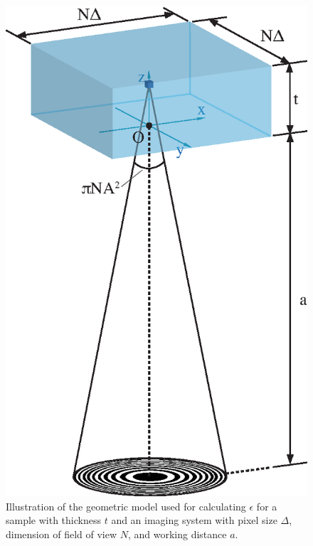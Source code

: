 \documentclass[]{article}
\begin{document}
\begin{figure}[!b]
\begin{center}
\includegraphics[scale=.6]{epsilon.eps}
\caption{Illustration of the geometric model used for calculating $\epsilon$ for a sample with thickness $t$ and an imaging system with pixel size \textit{$\Delta$}, dimension of field of view $N$, and working distance $a$.}
\label{fig:model}
\end{center}
\end{figure}
\end{document}
